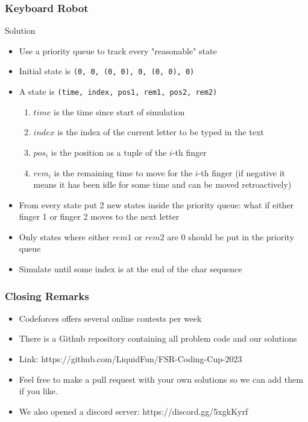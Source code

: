 \documentclass{beamer}
\begin{document}
\begin{frame}
    \frametitle{Keyboard Robot}
    \begin{block}{Solution}
        \begin{itemize}
            \item Use a priority queue to track every "reasonable" state
            \pause
            \item Initial state is {\tt (0, 0, (0, 0), 0, (0, 0), 0)}
            \pause
            \item A state is {\tt(time, index, pos1, rem1, pos2, rem2)}
            \begin{enumerate}
                \item $time$ is the time since start of simulation
                \item $index$ is the index of the current letter to be typed in the text
                \item $pos_{i}$ is the position as a tuple of the $i$-th finger
                \item $rem_{i}$ is the remaining time to move for the $i$-th finger (if negative it means it has been idle for some time and can be moved retroactively)

            \end{enumerate}
            \pause
            \item From every state put 2 new states inside the priority queue: what if either finger 1 or finger 2 moves to the next letter
            \pause
            \item Only states where either $rem1$ or $rem2$ are 0 should be put in the priority queue
            \pause
            \item Simulate until some index is at the end of the char sequence
        \end{itemize}
    \end{block} 
\end{frame}

\begin{frame}
    \frametitle{Closing Remarks}
    \begin{itemize}
        \item Codeforces offers several online contests per week
        \pause
        \item There is a Github repository containing all problem code and our solutions
        \item Link: https://github.com/LiquidFun/FSR-Coding-Cup-2023
        \item Feel free to make a pull request with your own solutions so we can add them if you like.
        \pause
        \item We also opened a discord server: https://discord.gg/5xgkKyrf
    \end{itemize}
\end{frame}
\end{document}
